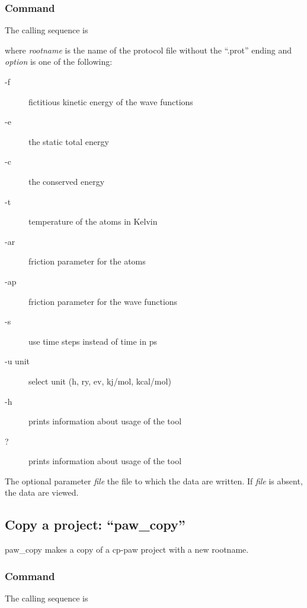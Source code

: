\documentclass[final,12pt,makeidx,DIV=calc]{article}
\begin{document}
{{{%
\subsubsection{Command}

The calling sequence is

\bigskip{}\bigskip

\noindent where {\it rootname} is the name of the protocol file 
without the ``.prot'' ending and {\it option} is one of the following:
\begin{description}
\item[-f] fictitious kinetic energy of the wave functions
\item[-e] the static total energy
\item[-c] the conserved energy
\item[-t] temperature of the atoms in Kelvin
\item[-ar] friction parameter for the atoms
\item[-ap] friction parameter for the wave functions
\item[-s] use time steps instead of time in ps
\item[-u unit] select unit (h, ry, ev, kj/mol, kcal/mol)     
\item[-h] prints information about usage of the tool 
\item[?] prints information about usage of the tool 
\end{description}
The optional parameter {\it file} the file to which the data are
written. If {\it file} is absent, the data are viewed.


\subsection{Copy a project: ``paw\_copy''}
paw\_copy makes a copy of a cp-paw project with a new rootname.


\subsubsection{Command}
The calling sequence is

}}}
\end{document}

